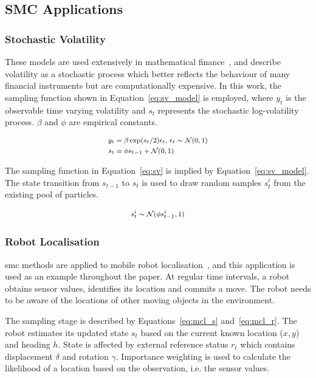 \subsection{SMC Applications}
\subsubsection{Stochastic Volatility}
\label{sec:vol}

These models are used extensively in mathematical
finance~\cite{casarin04,weng12}, and describe volatility as a
stochastic process which better reflects the behaviour of many
financial instruments but are computationally expensive. In this
work, the sampling function shown in Equation~\ref{eq:sv_model} is employed,
where $y_t$ is the observable time varying volatility and $s_t$ represents the stochastic log-volatility process.
$\beta$ and $\phi$ are empirical constants.

\begin{equation}
\footnotesize
\begin{aligned}
	y_t &= \beta \exp(s_t/2)\epsilon_t \mbox{, } \epsilon_t \sim \mathcal{N}(0,1) \\
	s_t &= \phi s_{t-1} + \mathcal{N}(0,1)
\end{aligned}
\label{eq:sv_model}
\end{equation}

The sampling function in Equation~\ref{eq:sv} is implied by Equation~\ref{eq:sv_model}.
The state transition from $s_{t-1}$ to $s_t$ is used to draw random samples $s^i_t$ from the existing pool of particles.

\begin{equation}
\footnotesize
\begin{aligned}
	s^i_{t} \sim \mathcal{N}(\phi s^i_{t-1},1)
\end{aligned}
\label{eq:sv}
\end{equation}

\subsubsection{Robot Localisation}
\gls{smc} methods are applied to mobile robot localisation~\cite{montemerlo02},
and this application is used as an example throughout the paper.
At regular time intervals, a robot obtains sensor values, identifies its location and commits a move.
The robot needs to be aware of the locations of other moving objects in the environment.

The sampling stage is described by Equations~\ref{eq:mcl_s} and~\ref{eq:mcl_r}. 
The robot estimates its updated state $s_t$ based on the current known location ($x, y$) and heading $h$.
State is affected by external reference status $r_t$ which contains displacement $\delta$ and rotation $\gamma$.
Importance weighting is used to calculate the likelihood of a location based on the observation, i.e. the sensor values.

